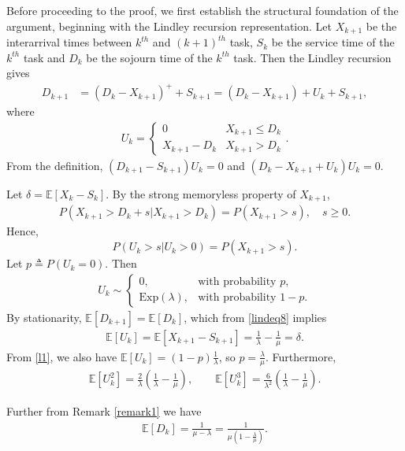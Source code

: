 \documentclass[11pt,letterpaper,reqno]{article}
\theoremstyle{thmstyleone}%
\theoremstyle{thmstyletwo}%
\theoremstyle{thmstylethree}%
\numberwithin{equation}{section}
\begin{document}
Before proceeding to the proof, we first establish the structural foundation of the argument, beginning with the Lindley recursion representation. Let $X_{k+1}$ be the interarrival times between $k^{th}$ and $(k+1)^{th}$ task, $S_k$ be the service time of the $k^{th}$ task and  $D_k$ be the sojourn time of the $k^{th}$ task. Then the Lindley recursion gives
\begin{align}\label{lindeq8}
    D_{k+1}&=(D_k-X_{k+1})^++S_{k+1 } =(D_k-X_{k+1})+U_k+S_{k+1},
\end{align}
where 
\begin{align*}
    U_k=\begin{cases}
        0 \quad  \ &X_{k+1}\leq D_k\\
        X_{k+1}-D_k & X_{k+1}>D_k
    \end{cases}.
\end{align*}
From the definition, $(D_{k+1}-S_{k+1})U_k=0$ and $(D_k-X_{k+1}+U_k)U_k=0$. 

Let $\delta=\mathbb E[X_k-S_k]$. By the strong memoryless property of $X_{k+1}$,
\begin{align*}
    P(X_{k+1}>D_{k}+s|X_{k+1}>D_k)=P(X_{k+1}>s), \quad s \ge 0.
\end{align*}
Hence, $$P(U_k>s|U_k>0)=P(X_{k+1}>s).$$ Let $p  \triangleq P(U_k=0)$. Then   
\begin{align}\label{l1}
      U_k \sim \begin{cases}
        0, & \text{with probability } p, \\[4pt]
        \mathrm{Exp}(\lambda), & \text{with probability } 1-p .
    \end{cases}
\end{align}
By stationarity, $\mathbb{E}[D_{k+1}] = \mathbb{E}[D_k]$, which from \eqref{lindeq8} implies
\begin{align}\label{lindeq6}
    \mathbb E[U_k]=\mathbb E[X_{k+1}-S_{k+1}]=\frac{1}{\lambda}-\frac{1}{\mu}=\delta.
\end{align}
From \eqref{l1},  we also have $\mathbb{E}[U_k] = (1-p)\tfrac{1}{\lambda}$, so
$p = \tfrac{\lambda}{\mu}$. Furthermore,
\begin{align*}
    \mathbb{E}[U_k^2] = \frac{2}{\lambda}\left(\frac{1}{\lambda}-\frac{1}{\mu}\right),
    \qquad
    \mathbb{E}[U_k^3] = \frac{6}{\lambda^2}\left(\frac{1}{\lambda}-\frac{1}{\mu}\right).
\end{align*}


Further from Remark \ref{remark1} we have
\begin{align}\label{lindeq7}
    \mathbb E[D_k]=\frac{1}{\mu-\lambda}=\frac{1}{\mu(1-\frac{\lambda}{\mu})}.
\end{align}
\end{document}
